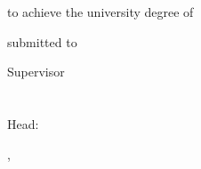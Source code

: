 
\begin{titlepage}


%

\centering
~
\vfill\vfill\vfill

\sffamily

\myauthorwithexistingtitles

\vfill

{\LARGE\bfseries\mytitle}

{\Large\bfseries\mysubtitle}

\vfill\vfill\vfill\vfill

{\normalsize\bfseries\myworktitle}\\
\vfill
to achieve the university degree of\\
{\mygrade}

\mydegreeprogramme


\vfill
submitted to \\
{\normalsize\bfseries\myuniversity}

\vfill\vfill\vfill
\vfill\vfill\vfill

Supervisor\\
\mysupervisor\\
\vfill
\vfill
\vfill
\myinstitute\\
Head: \myinstitutehead\\

\vfill

\myfaculty

\vfill\vfill\vfill

{\scriptsize\mysubmissiontown, \mysubmissionmonth~\mysubmissionyear}

\end{titlepage}

